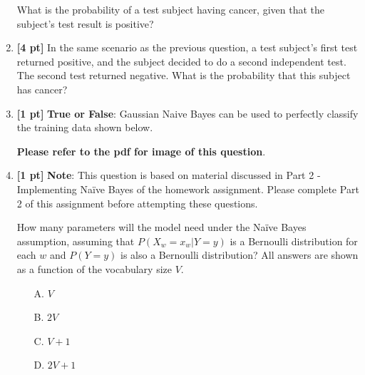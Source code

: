 \documentclass{article}
\begin{document}
\begin{enumerate}
    What is the probability of a test subject having cancer, given that the subject's test result is positive? 
    \begin{tcolorbox}[width=\linewidth/3,height=1.5cm]
    \end{tcolorbox}
    
    \item \textbf{[4 pt]} In the same scenario as the previous question, a test subject's first test returned positive, and the subject decided to do a second independent test. The second test returned negative. What is the probability that this subject has cancer?
    \begin{tcolorbox}[width=\linewidth/3,height=1.5cm]
    \end{tcolorbox}
    \newpage
    \item \textbf{[1 pt]} \textbf{True or False}: Gaussian Naive Bayes can be used to perfectly classify the training data shown below.
    \begin{center}
    \vspace{2em}
        \textbf{Please refer to the pdf for image of this question}.
    \vspace{2em}
    \end{center}
    \begin{tcolorbox}[width=\linewidth/3,height=1.5cm]
    \end{tcolorbox}
    
    \item \textbf{[1 pt]} \textbf{Note}: This question is based on material discussed in Part 2 - Implementing Na{\"i}ve Bayes of the homework assignment. Please complete Part 2 of this assignment before attempting these questions.
    
    How many parameters will the model need under the Na{\"i}ve Bayes assumption, assuming that $P(X_w = x_w \vert Y = y)$ is a Bernoulli distribution for each $w$ and $P(Y=y)$ is also a Bernoulli distribution? All answers are shown as a function of the vocabulary size $V$.
    \begin{itemize}
        \item[A.] $V$
        \item[B.] $2V$
        \item[C.] $V+1$
        \item[D.] $2V+1$
    \end{itemize}
    \begin{tcolorbox}[width=\linewidth/3,height=1.5cm]
    \end{tcolorbox}
    

\end{enumerate}
\end{document}
